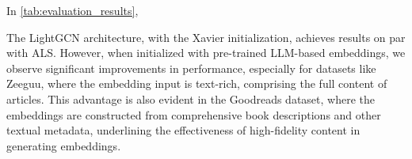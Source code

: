 \begin{table}[ht]
\centering
\begin{mmblock}
\caption{Relative difference in NDCG@5 (\%) between pairs of LightGCN variants and ALS, computed on the per-user NDCG@5 averaged over \RSseeds{}. ``Xavier'' is the Xavier initialisation of the same dimension as the LLM embedding. Two-sided Wilcoxon signed-rank test on the paired per-user scores, Holm--Bonferroni correction over the 20 tests: $^{*}p<0.05$, $^{**}p<0.01$, $^{***}p<0.001$.}
\label{tab:increase_ndcg}

\end{mmblock}
\end{table}

In \autoref{tab:evaluation_results}, 

The LightGCN architecture, with the Xavier initialization, achieves results on par with ALS. However, when initialized with pre-trained LLM-based embeddings, we observe significant improvements in performance, especially for datasets like Zeeguu, where the embedding input is text-rich, comprising the full content of articles. This advantage is also evident in the Goodreads dataset, where the embeddings are constructed from comprehensive book descriptions and other textual metadata, underlining the effectiveness of high-fidelity content in generating embeddings.

